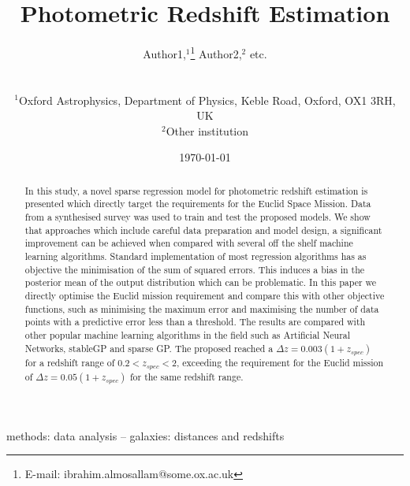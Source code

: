 \documentclass[useAMS,usenatbib,fleqn]{mn2e}
\title[Photometric Redshift Estimation]{Photometric Redshift Estimation}
\author[Almosallam et al.]
{\parbox{\textwidth}{Author1,$^1$\thanks{E-mail: ibrahim.almosallam@some.ox.ac.uk} 
Author2,$^{2}$ etc.
} 
\vspace{0.4cm}\\ 
\parbox{\textwidth}{
$^1$Oxford Astrophysics, Department of Physics, Keble Road, Oxford, OX1 3RH, UK\\
$^2$Other institution \\
}}
\begin{document}
\date{\today}

\pagerange{\pageref{firstpage}--\pageref{lastpage}} 

\maketitle

\label{first page}

\begin{abstract}
In this study, a novel sparse regression model for photometric redshift estimation is presented which directly target the requirements for the Euclid Space Mission. Data from a synthesised survey was used to train and test the proposed models. We show that approaches which include careful data preparation and model design, a significant improvement can be achieved when compared with several off the shelf machine learning algorithms. Standard implementation of most regression algorithms has as objective the minimisation of the sum of squared errors. This induces a bias in the posterior mean of the output distribution which can be problematic. In this paper we directly optimise the Euclid mission requirement and compare this with other objective functions, such as minimising the maximum error and maximising the number of data points with a predictive error less than a threshold. The results are compared with other popular machine learning algorithms in the field such as Artificial Neural Networks, stableGP and sparse GP. The proposed reached a $\Delta z = 0.003(1+z_{spec})$ for a redshift range of $0.2 < z_{spec} < 2$, exceeding the requirement for the Euclid mission of $\Delta z = 0.05(1+z_{spec})$ for the same redshift range.

\end{abstract}

\begin{keywords}
methods: data analysis -- galaxies: distances and redshifts
\end{keywords}
\end{document}
